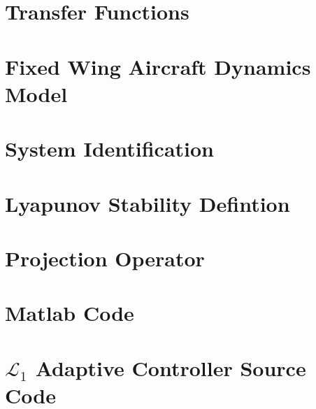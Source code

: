 \documentclass[twoside,thesis,twoadvisorsreader]{npsreport}
\newcommand{\Lone}{$\mathcal{L}_1$ }
\begin{document}
\NPSappendices

\chapter{Transfer Functions}


\chapter{Fixed Wing Aircraft Dynamics Model}


\chapter{System Identification}


\chapter{Lyapunov Stability Defintion}


\chapter{Projection Operator}


\chapter{Matlab Code}


\chapter{\Lone Adaptive Controller Source Code}


%

%


%
%
\NPSend
\end{document}
